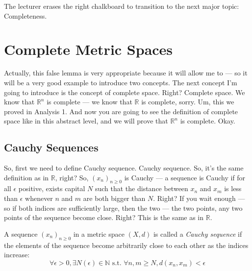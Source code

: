 \begin{meta-note}[Transition]
The lecturer erases the right chalkboard to transition to the next major topic: Completeness.
\end{meta-note}

\section{Complete Metric Spaces}

\begin{spoken-clean}[00:15:51 - 00:17:20]
Actually, this false lemma is very appropriate because it will allow me to — so it will be a very good example to introduce two concepts. The next concept I'm going to introduce is the concept of complete space. Right? Complete space. We know that $\mathbb{R}^n$ is complete — we know that $\mathbb{R}$ is complete, sorry. Um, this we proved in Analysis 1. And now you are going to see the definition of complete space like in this abstract level, and we will prove that $\mathbb{R}^n$ is complete. Okay.
\end{spoken-clean}

\subsection{Cauchy Sequences}

\begin{spoken-clean}[00:17:21 - 00:18:48]
So, first we need to define Cauchy sequence. Cauchy sequence.  So, it's the same definition as in $\mathbb{R}$, right? So, $(x_n)_{n \ge 0}$ is Cauchy — a sequence is Cauchy if for all $\epsilon$ positive, exists capital $N$ such that the distance between $x_n$ and $x_m$ is less than $\epsilon$ whenever $n$ and $m$ are both bigger than $N$. Right? If you wait enough — so if both indices are sufficiently large, then the two — the two points, any two points of the sequence become close. Right? This is the same as in $\mathbb{R}$.
\end{spoken-clean}

\begin{math-stroke}
\begin{definition}\label{def:cauchy-sequence}
A sequence $(x_n)_{n \ge 0}$ in a metric space $(X, d)$ is called a \emph{Cauchy sequence} if the elements of the sequence become arbitrarily close to each other as the indices increase:
\[ \forall \epsilon > 0, \exists N(\epsilon) \in \mathbb{N} \text{ s.t. } \forall n, m \ge N, d(x_n, x_m) < \epsilon \]
\end{definition}
\end{math-stroke}

